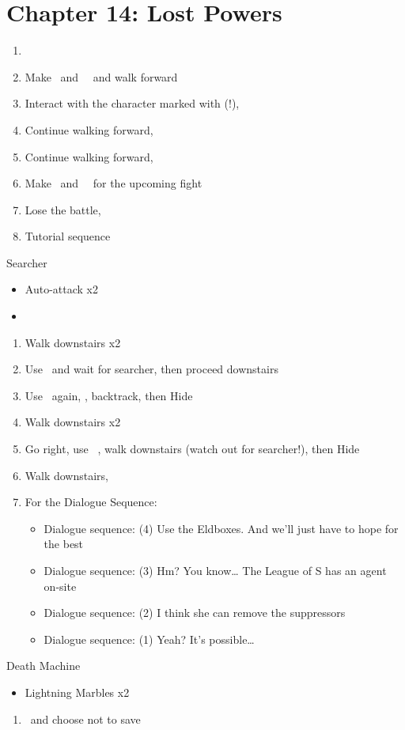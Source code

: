 \chapter{Chapter 14: Lost Powers}
\begin{enumerate}
    \item \cs\
    \item Make \lann\ and \reynn\ \bigc\ and walk forward
    \item Interact with the character marked with (!), \cs\
    \item Continue walking forward, \cs\
    \item Continue walking forward, \cs\
    \item Make \lann\ and \reynn\ \smallc\ for the upcoming fight
    \item Lose the battle, \cs\
    \item Tutorial sequence
\end{enumerate}
\begin{battle}[]{Searcher}
    \begin{itemize}
        \item Auto-attack x2
        \item \imprism\
    \end{itemize}
\end{battle}
\begin{enumerate}[resume]
    \item Walk downstairs x2
    \item Use \zap\ and wait for searcher, then proceed downstairs
    \item Use \zap\ again, , backtrack, then Hide
    \item Walk downstairs x2
    \item Go right, use \zap\, , walk downstairs (watch out for searcher!), then Hide
    \item Walk downstairs, \save\
    \item For the Dialogue Sequence:
    \begin{itemize}
        \item Dialogue sequence: (4) Use the Eldboxes. And we’ll just have to hope for the best
        \item Dialogue sequence: (3) Hm? You know… The League of S has an agent on-site
        \item Dialogue sequence: (2) I think she can remove the suppressors
        \item Dialogue sequence: (1) Yeah? It’s possible\ldots\
    \end{itemize}
\end{enumerate}
\begin{battle}[]{Death Machine}
    \begin{itemize}
        \item Lightning Marbles x2
    \end{itemize}
\end{battle}
\begin{enumerate}[resume]
    \item \cs\ and choose not to save
\end{enumerate}